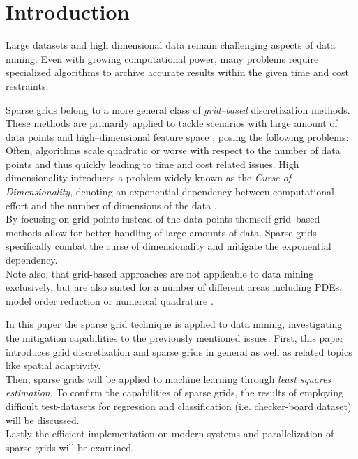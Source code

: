 \section{Introduction}
Large datasets and high dimensional data remain challenging aspects of data
mining. Even with growing computational power, many problems require
specialized algorithms to archive accurate results within the given time and
cost restraints.

\par

Sparse grids belong to a more general class of \emph{grid--based}
discretization methods. These methods are primarily applied to
tackle scenarios with large amount of data points and high--dimensional
feature space \cite{artbunshort}, posing the following problems:
\\
Often, algorithms scale quadratic or worse with respect to the number of data points and
thus quickly leading to time and cost related issues.
High dimensionality introduces a problem widely known as the \emph{Curse of
Dimensionality}, denoting an exponential dependency between computational
effort and the number of dimensions of the data \cite{artbunshort, disspfl}. \\
By focusing on grid points instead
of the data points themself grid--based methods allow for better handling of large amounts of data. 
Sparse grids specifically combat the curse of dimensionality and mitigate
the exponential dependency. \\
Note also, that grid-based approaches are not applicable to data mining
exclusively, but are also
suited for a number of different areas including PDEs, model order
reduction \cite{disspeh} or numerical quadrature \cite{artbunlong}.

\par

In this paper the sparse grid technique is applied to data mining,
investigating the mitigation capabilities to the previously mentioned issues.
First, this paper introduces grid discretization and sparse grids in
general as well as related topics like spatial adaptivity. \\
Then, sparse grids will be applied to machine learning
through \emph{least squares estimation}. To confirm the capabilities
of sparse grids, the results of employing difficult
test-datasets for regression and classification (i.e.
checker-board dataset) will be discussed. \\
Lastly the efficient implementation on modern systems and parallelization of
sparse grids will be examined.

